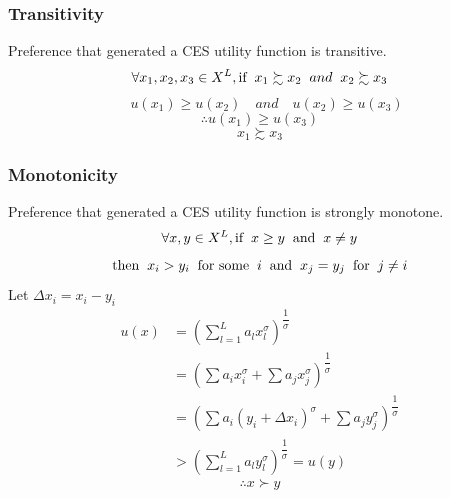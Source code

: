 \subsubsection{Transitivity}
Preference that generated a CES utility function is transitive.
$$\forall x_1, x_2,x_3 \in X^L, \text{if} \hspace*{2mm} x_1 \succsim x_2 \hspace*{2mm} and \hspace*{2mm} x_2 \succsim x_3$$
$$\quad u(x_1)\geq u(x_2) \quad and \quad u(x_2)\geq u(x_3)$$
$$\therefore u(x_1)\geq u(x_3)$$
$$x_1 \succsim x_3$$
\subsubsection{Monotonicity}
Preference that generated a CES utility function is strongly monotone.
$$\forall x, y \in X^L, \text{if} \hspace*{2mm} x\geq y  \hspace*{2mm} \text{and} \hspace*{2mm} x\neq y$$
$$\text{then}  \hspace*{2mm} x_{i}>y_{i}  \hspace*{2mm}\text{for some} \hspace*{2mm} i  \hspace*{2mm} \text{and} \hspace*{2mm} x_j=y_j  \hspace*{2mm} \text{for}  \hspace*{2mm} j\neq i$$
Let $\Delta x_i = x_i-y_i$
\begin{align*}
u(x) &= \left(\sum_{l=1}^{L}a_lx_l^\sigma\right)^{\dfrac{1}{\sigma}}\\
     &= \left(\sum a_ix_i^\sigma+\sum a_jx_j^\sigma\right)^{\dfrac{1}{\sigma}}\\
     &= \left(\sum a_i(y_i+\Delta x_i)^\sigma+\sum a_jy_j^\sigma\right)^{\dfrac{1}{\sigma}}\\
     &>\left(\sum_{l=1}^{L}a_ly_l^\sigma \right)^{\dfrac{1}{\sigma}} = u(y)
\end{align*}
$$\therefore x\succ y$$
